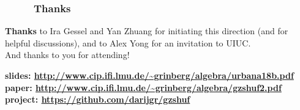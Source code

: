 \documentclass{beamer}
\newcommand{\red}{\color{red}}
\newcommand{\fti}[1]{\frametitle{\ \ \ \ \ #1}}
\theoremstyle{plain}
\begin{document}
\begin{frame}
\fti{Thanks}

\textbf{Thanks} to Ira Gessel and Yan Zhuang for initiating this direction
(and for helpful discussions), and to
Alex Yong for an invitation to UIUC. \\
And thanks to you for attending!

\vspace{3cm}

\textbf{slides: \red \url{http://www.cip.ifi.lmu.de/~grinberg/algebra/urbana18b.pdf}} \\
\textbf{paper: \red \url{http://www.cip.ifi.lmu.de/~grinberg/algebra/gzshuf2.pdf}} \\
\textbf{project: \red \url{https://github.com/darijgr/gzshuf}}

\end{frame}
\end{document}
